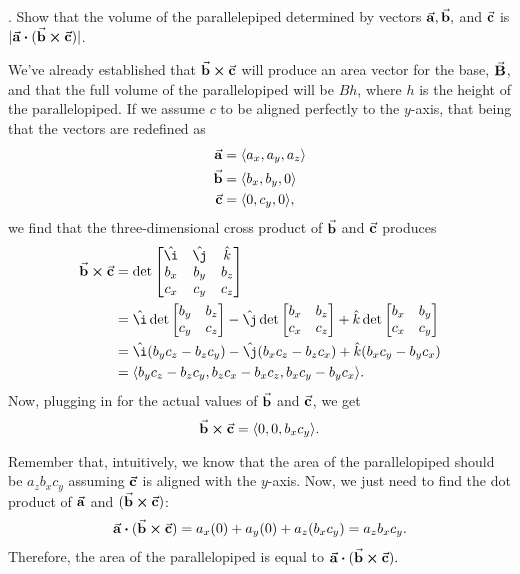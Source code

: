 \documentclass{report}
\newcounter{problemctr}
\newcounter{subproblemctr}[problemctr]
\newcommand{\problem}[1]{%
  \stepcounter{problemctr}%
  \setcounter{subproblemctr}{0}%
  \noindent\arabic{problemctr}. #1\par
}
\newenvironment{answer}
{\begin{minipage}{\linewidth}}
{\end{minipage}}
\begin{document}
\problem{Show that the volume of the parallelepiped determined by vectors $\va{a}, \va{b},$ and $\va{c}$ is $|\va{a} \vdot (\va{b} \cross \va{c})|$.}
\begin{answer}
We've already established that $\va{b} \cross \va{c}$ will produce an area vector for the base, $\va{B}$, and that the full volume of the parallelopiped will be $Bh$, where $h$ is the height of the parallelopiped. If we assume $c$ to be aligned perfectly to the $y$-axis, that being that the vectors are redefined as
\begin{align*}
\va{a} &= \langle a_x, a_y, a_z \rangle \\
\va{b} &= \langle b_x, b_y, 0 \rangle \\
\va{c} &= \langle 0, c_y, 0 \rangle,
\end{align*}
we find that the three-dimensional cross product of $\va{b}$ and $\va{c}$ produces
\begin{align*}
\va{b} \cross \va{c} &= \det 
\begin{bmatrix}
\hat{\i} & \hat{\j} & \hat{k} \\
b_x & b_y & b_z \\
c_x & c_y & c_z
\end{bmatrix} \\
&= \hat{\i} \det \begin{bmatrix} b_y & b_z \\ c_y & c_z \end{bmatrix}
 - \hat{\j} \det \begin{bmatrix} b_x & b_z \\ c_x & c_z \end{bmatrix}
 + \hat{k} \det \begin{bmatrix} b_x & b_y \\ c_x & c_y \end{bmatrix} \\
&= \hat{\i} (b_y c_z - b_z c_y) - \hat{\j} (b_x c_z - b_z c_x) + \hat{k} (b_x c_y - b_y c_x) \\
&= \langle b_y c_z - b_z c_y, b_z c_x - b_x c_z, b_x c_y - b_y c_x \rangle.
\end{align*}
Now, plugging in for the actual values of $\va{b}$ and $\va{c}$, we get
$$\va{b} \cross \va{c} = \langle 0, 0, b_x c_y \rangle.$$

Remember that, intuitively, we know that the area of the parallelopiped should be $a_z b_x c_y$ assuming $\va{c}$ is aligned with the $y$-axis. Now, we just need to find the dot product of $\va{a}$ and $(\va{b} \cross \va{c})$:
\begin{align*}
\va{a} \vdot (\va{b} \cross \va{c}) = a_x (0) + a_y (0) + a_z (b_x c_y) = a_z b_x c_y.
\end{align*}
Therefore, the area of the parallelopiped is equal to $\va{a} \vdot (\va{b} \cross \va{c}).$
\end{answer}
\end{document}
